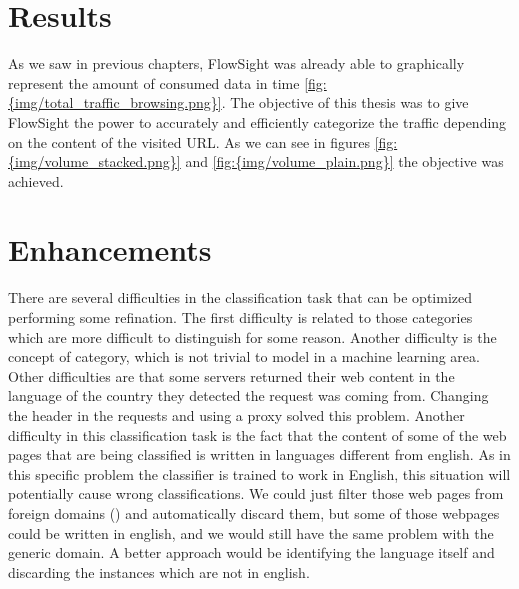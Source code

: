 

\section{Results}

As we saw in previous chapters, FlowSight was already able to graphically represent the amount of consumed data in time \ref{fig:{img/total_traffic_browsing.png}}. The objective of this thesis was to
give FlowSight the power to accurately and efficiently categorize the traffic depending on the content of the visited URL. As we can see in figures \ref{fig:{img/volume_stacked.png}} and 
\ref{fig:{img/volume_plain.png}} the objective was achieved.
 
\clearpage
{}




\section{Enhancements}

There are several difficulties in the classification task that can be optimized performing some refination. 
The first difficulty is related to those categories which are more difficult to distinguish for some reason. Another difficulty is the concept of  category, which is not trivial to
model in a machine learning area.
Other difficulties are that some servers returned their web content in the language of the country they detected the request was coming from. Changing the header in the requests and using a proxy 
solved this problem.  
Another difficulty in this classification task is the fact that the content of some of the web pages that are being classified is written in languages different from english. 
As in this specific problem the classifier is trained to work in English, this situation will potentially cause wrong classifications. 
We could just filter those web pages from foreign domains () and automatically discard them, but some of those webpages could be written in english, and we would still have the same 
problem with the generic  domain.
A better approach would be identifying the language itself and discarding the instances  which are not in english.


